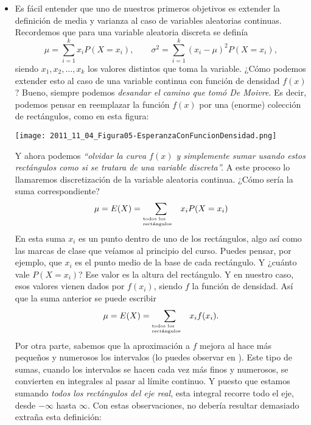 \begin{itemize}
    \item Es fácil entender que uno de nuestros primeros objetivos es extender la definición de media y varianza al caso de variables aleatorias continuas. Recordemos que para una variable aleatoria discreta se definía
    \[\mu=\sum_{i=1}^{k}x_iP(X=x_i),\qquad  \sigma^2=\sum_{i=1}^{k}(x_i-\mu)^2P(X=x_i),\]
    siendo $x_1,x_2,\ldots,x_k$ los valores distintos que toma la variable. ¿Cómo podemos extender esto al caso de una variable continua con función de densidad $f(x)$? Bueno, siempre podemos {\em desandar el camino que tomó De Moivre}. Es decir, podemos pensar en reemplazar la función $f(x)$ por una (enorme) colección de rectángulos, como en esta figura:
   \begin{center}
   \texttt{[image: 2011\_11\_04\_Figura05-EsperanzaConFuncionDensidad.png]}
   \end{center}
   Y ahora podemos {\em ``olvidar la curva $f(x)$ y simplemente sumar usando estos rectángulos como si se tratara de una variable discreta''.} A este proceso lo llamaremos {\sf discretización} de la variable aleatoria continua. ¿Cómo sería la suma correspondiente?
   \[\mu=E(X)=\sum_{\begin{minipage}{1.5cm}\tiny todos los\\ rectángulos\end{minipage}} x_iP(X=x_i)\]
   En esta suma $x_i$ es un punto dentro de uno de los rectángulos, algo así como las marcas de clase que veíamos al principio del curso. Puedes pensar, por ejemplo, que $x_i$ es el punto medio de la base de cada rectángulo.  Y ¿cuánto vale $P(X=x_i)$? Ese valor es la altura del rectángulo. Y en nuestro caso, esos valores vienen dados por $f(x_i)$, siendo $f$ la función de densidad. Así que la suma anterior se puede escribir
   \[\mu=E(X)=\sum_{\begin{minipage}{1.5cm}\tiny todos los\\ rectángulos\end{minipage}} x_if(x_i).\]
   Por otra parte, sabemos que la aproximación a $f$ mejora al hace más pequeños y numerosos los intervalos (lo puedes observar en  ). Este tipo de sumas, cuando los intervalos se hacen cada vez más finos y numerosos, se convierten en integrales al pasar al límite continuo. Y puesto que estamos sumando {\em todos los rectángulos del eje real}, esta integral recorre todo el eje, desde $-\infty$ hasta $\infty$. Con estas observaciones, no debería resultar demasiado extraña esta definición:\\[3mm]

\end{itemize}
